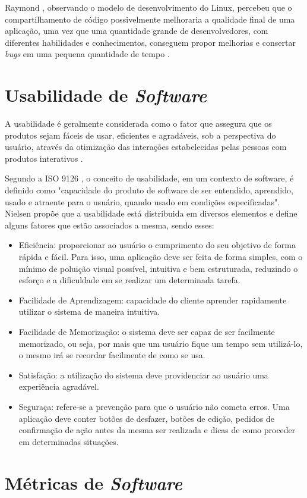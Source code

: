 Raymond \cite{raymond1999}, observando o modelo de desenvolvimento do Linux, percebeu que o compartilhamento de código possivelmente melhoraria a qualidade final de uma aplicação, uma vez que uma quantidade grande de desenvolvedores, com diferentes habilidades e conhecimentos, conseguem propor melhorias e consertar \textit{bugs} em uma pequena quantidade de tempo \cite{meirelles2013}.

\section{Usabilidade de \textit{Software}}
A usabilidade é geralmente considerada como o fator que assegura que
os produtos sejam fáceis de usar, eficientes e agradáveis, sob a
perspectiva do usuário, através da otimização das interações
estabelecidas pelas pessoas com produtos interativos \cite{rogers_2013}.

Segundo a ISO 9126 \cite{iso9126}, o conceito de usabilidade, em um contexto de software, é definido como "capacidade do produto de software de ser entendido, aprendido, usado e atraente para o usuário, quando usado em condições especificadas". Nielsen \cite{nielsen_1994} propõe que a usabilidade está distribuida em diversos elementos e define alguns fatores que estão associados a mesma, sendo esses:

\begin{itemize}
    \item Eficiência: proporcionar ao usuário o cumprimento do seu objetivo de forma rápida e fácil. Para isso, uma aplicação deve ser feita de forma simples, com o mínimo de poluição visual possível, intuitiva e bem estruturada, reduzindo o esforço e a dificuldade em se realizar um determinada tarefa.
    \item Facilidade de Aprendizagem: capacidade do cliente aprender rapidamente utilizar o sistema de maneira intuitiva.
    \item Facilidade de Memorização: o sistema deve ser capaz de ser facilmente memorizado, ou seja, por mais que um usuário fique um tempo sem utilizá-lo, o mesmo irá se recordar facilmente de como se usa.
    \item Satisfação: a utilização do sistema deve providenciar ao usuário uma experiência agradável.
    \item Seguraça: refere-se a prevenção para que o usuário não cometa erros. Uma aplicação deve conter botões de desfazer, botões de edição, pedidos de confirmação de ação antes da mesma ser realizada e dicas de como proceder em determinadas situações.
\end{itemize}

\section{Métricas de \textit{Software}}
